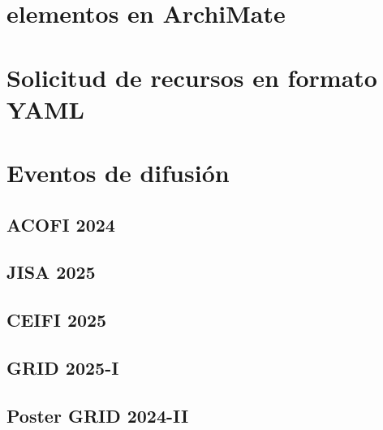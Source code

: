\FloatBarrier\chapter{elementos en ArchiMate}


\FloatBarrier\chapter{Solicitud de recursos en formato YAML}


\FloatBarrier\chapter{Eventos de difusión}

\FloatBarrier\section{ACOFI 2024}


\FloatBarrier\section{JISA 2025}


\FloatBarrier\section{CEIFI 2025}


\FloatBarrier\section{GRID 2025-I }


\FloatBarrier\section{Poster GRID 2024-II}
